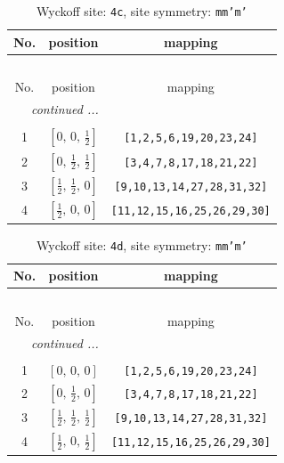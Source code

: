 \documentclass[fleqn,8pt]{jsarticle}
\begin{document}
\renewcommand{\arraystretch}{1.2}
\begin{longtable}{ccc}
\caption{Wyckoff site: {\tt 4c}, site symmetry: {\tt mm'm'}}
 \\
 \hline \hline
No. & position & mapping \\ \hline \endfirsthead

\multicolumn{2}{l}{\tablename\ \thetable{}} \\
 \hline \hline
No. & position & mapping \\ \hline \endhead

 \hline \hline
\multicolumn{2}{r}{\footnotesize\it continued ...} \\ \endfoot

 \hline \hline
\multicolumn{2}{r}{} \\ \endlastfoot

1 & $\left[ 0,\, 0,\, \frac{1}{2} \right]$ & {\tt [1,2,5,6,19,20,23,24]} \\ \hline
2 & $\left[ 0,\, \frac{1}{2},\, \frac{1}{2} \right]$ & {\tt [3,4,7,8,17,18,21,22]} \\ \hline
3 & $\left[ \frac{1}{2},\, \frac{1}{2},\, 0 \right]$ & {\tt [9,10,13,14,27,28,31,32]} \\ \hline
4 & $\left[ \frac{1}{2},\, 0,\, 0 \right]$ & {\tt [11,12,15,16,25,26,29,30]} \\
\end{longtable}
\renewcommand{\arraystretch}{1.2}
\begin{longtable}{ccc}
\caption{Wyckoff site: {\tt 4d}, site symmetry: {\tt mm'm'}}
 \\
 \hline \hline
No. & position & mapping \\ \hline \endfirsthead

\multicolumn{2}{l}{\tablename\ \thetable{}} \\
 \hline \hline
No. & position & mapping \\ \hline \endhead

 \hline \hline
\multicolumn{2}{r}{\footnotesize\it continued ...} \\ \endfoot

 \hline \hline
\multicolumn{2}{r}{} \\ \endlastfoot

1 & $\left[ 0,\, 0,\, 0 \right]$ & {\tt [1,2,5,6,19,20,23,24]} \\ \hline
2 & $\left[ 0,\, \frac{1}{2},\, 0 \right]$ & {\tt [3,4,7,8,17,18,21,22]} \\ \hline
3 & $\left[ \frac{1}{2},\, \frac{1}{2},\, \frac{1}{2} \right]$ & {\tt [9,10,13,14,27,28,31,32]} \\ \hline
4 & $\left[ \frac{1}{2},\, 0,\, \frac{1}{2} \right]$ & {\tt [11,12,15,16,25,26,29,30]} \\
\end{longtable}
\end{document}
